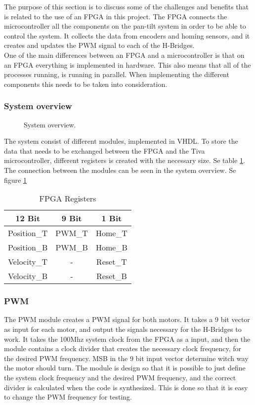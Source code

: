\documentclass[../../../main]{subfiles}
\begin{document}
The purpose of this section is to discuss some of the challenges and benefits that is related to the use of an FPGA in this project.
The FPGA connects the  microcontroller all the components on the pan-tilt system in order to be able to control the system. It collects the data from encoders and homing sensors, and it creates and updates the PWM signal to each of the H-Bridges.
\\
One of the main differences between an FPGA and a microcontroller is that on an FPGA everything is implemented in hardware. This also means that all of the processes running, is running in parallel. When implementing the different components this needs to be taken into consideration.
\subsubsection{System overview}%
\label{sub:system_overview}

\begin{figure}[H]
  \centering
  \def\svgwidth{\textwidth}
  
  \caption{System overview.}
  \label{fig:FPGA_system_overview}
\end{figure}

The system consist of different modules, implemented in VHDL. 
To store the data that needs to be exchanged between the FPGA and the Tiva microcontroller, different registers is created with the necessary size. Se table \ref{table:FPGA_registers}.
\\
The connection between the modules can be seen in the system overview. Se figure \ref{fig:FPGA_system_overview}
\begin{table}[H]
\begin{tabular}{|c|c|c|}
\hline
\textbf{12 Bit} & \textbf{9 Bit} & \textbf{1 Bit} \\ \hline
Position\_T     & PWM\_T         & Home\_T        \\ \hline
Position\_B     & PWM\_B         & Home\_B        \\ \hline
Velocity\_T     & -              & Reset\_T       \\ \hline
Velocity\_B     & -              & Reset\_B       \\ \hline
\end{tabular}
\caption{FPGA Registers}
\label{table:FPGA_registers}
\end{table}
\subsubsection{PWM}
The PWM module creates a PWM signal for both motors. It takes a 9 bit vector as input for each motor, and output the signals necessary for the H-Bridges to work. 
It takes the 100Mhz system clock from the FPGA as a input, and then the module contains a clock divider that creates the necessary clock frequency, for the desired PWM frequency. 
MSB in the 9 bit input vector determine witch way the motor should turn. 
The module is design so that it is possible to just define the system clock frequency and the desired PWM frequency, and the correct divider is calculated when the code is synthesized.
This is done so that it is easy to change the PWM frequency for testing.
\end{document}
